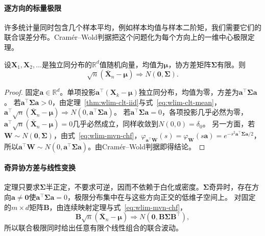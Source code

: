 \paragraph{逐方向的标量极限}
许多统计量同时包含几个样本平均，例如样本均值与样本二阶矩，我们需要它们的联合误差分布。Cram\'er--Wold判据把这个问题化为每个方向上的一维中心极限定理。

\begin{theorem}[多维中心极限定理]
\label{thm:wlim-clt-vector}
设$\bm X_1,\bm X_2,\ldots$是独立同分布的$\mathbb R^d$值随机向量，均值为$\bm\mu$，协方差矩阵$\bm\Sigma$有限。则
\[
  \sqrt n(\bar{\bm X}_n-\bm\mu)\Rightarrow N(\bm 0,\bm\Sigma).
\]
\end{theorem}

\begin{proof}
固定$\bm a\in\mathbb R^d$。单项投影$\bm a^\top(\bm X_k-\bm\mu)$独立同分布，均值为零，方差为$\bm a^\top\bm\Sigma\bm a$。
若$\bm a^\top\bm\Sigma\bm a>0$，由定理~\ref{thm:wlim-clt-iid}与式~\eqref{eq:wlim-clt-mean}，$\bm a^\top\sqrt n(\bar{\bm X}_n-\bm\mu)\Rightarrow N(0,\bm a^\top\bm\Sigma\bm a)$。
若$\bm a^\top\bm\Sigma\bm a=0$，各项投影几乎必然为零，$\bm a^\top\sqrt n(\bar{\bm X}_n-\bm\mu)=0$几乎必然成立，同样收敛到$N(0,0)=\delta_0$。
另一方面，若$\bm W\sim N(\bm 0,\bm\Sigma)$，由式~\eqref{eq:wlim-mvn-chf}，$\varphi_{\bm a^\top\bm W}(s)=\varphi_{\bm W}(s\bm a)=e^{-s^2\bm a^\top\bm\Sigma\bm a/2}$，所以$\bm a^\top\bm W\sim N(0,\bm a^\top\bm\Sigma\bm a)$。由Cram\'er--Wold判据即得结论。
\end{proof}

\paragraph{奇异协方差与线性变换}
定理只要求$\bm\Sigma$半正定，不要求可逆，因而不依赖于白化或密度。$\bm\Sigma$奇异时，存在方向$\bm a\neq\bm 0$使$\bm a^\top\bm\Sigma\bm a=0$，极限分布集中在与这些方向正交的低维子空间上。
对固定的$m\times d$矩阵$\bm B$，由连续映射定理与式~\eqref{eq:wlim-mvn-chf}，
\[
  \bm B\sqrt n(\bar{\bm X}_n-\bm\mu)\Rightarrow N(\bm 0,\bm B\bm\Sigma\bm B^\top),
\]
所以联合极限同时给出任意有限个线性组合的联合波动。

